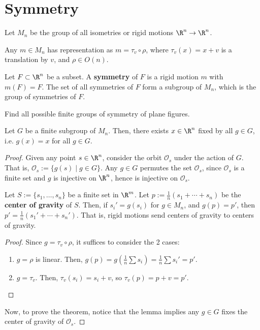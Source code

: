 \section{Symmetry}

Let $M_n$ be the group of all isometries or rigid motions $\R^n \to \R^n$.

\begin{notebox*}[Recall]
    Any $m \in M_n$ has representation as $m=\tau _v \circ \rho$, where $\tau _v(x) = x+v$ is a translation by $v$, and $\rho \in O(n)$.
\end{notebox*}

\begin{defn}
    Let $F \subset \R^n$ be a subset. A \textbf{symmetry} of $F$ is a rigid motion $m$ with $m(F)=F$. The set of all symmetries of $F$ form a subgroup of $M_n$, which is the group of symmetries of $F$.
\end{defn}

\begin{notebox*}[Goal]
    Find all possible finite groups of symmetry of plane figures.
\end{notebox*}

\begin{thm}
    Let $G$ be a finite subgroup of $M_n$. Then, there exists $x \in \R^n$ fixed by all $g \in G$, i.e. $g(x)=x$ for all $g \in G$.
\end{thm}

\begin{proof}
    Given any point $s \in \R^n$, consider the orbit $\mathcal O_s$ under the action of $G$. That is, $\mathcal O_s:=\{g(s)\mid g \in G\}$. Any $g \in G$ permutes the set $\mathcal O_s$, since $\mathcal O_s$ is a finite set and $g$ is injective on $\R^n$, hence is injective on $\mathcal O_s$.
    \begin{lem}
        Let $S:=\{s_1,\dots,s_n\}$ be a finite set in $\R^m$. Let $p:= \frac 1n(s_1+\cdots +s_n)$ be the \textbf{center of gravity} of $S$. Then, if $s_i'=g(s_i)$ for $g \in M_n$, and $g(p)=p'$, then $p'=\frac 1n(s_1'+\cdots +s_n')$. That is, rigid motions send centers of gravity to centers of gravity.
    \end{lem}
    \begin{proof}
        Since $g = \tau_v \circ \rho$, it suffices to consider the 2 cases:
        \begin{enumerate}
            \item[(i)] $g=\rho$ is linear. Then, $g(p)=g(\frac 1n \sum s_i)=\frac 1n \sum s_i'=p'$.
            \item[(ii)] $g = \tau _v$. Then, $\tau_v(s_i)=s_i+v$, so $\tau _v(p)=p+v=p'$.
        \end{enumerate}
    \end{proof}
    Now, to prove the theorem, notice that the lemma implies any $g \in G$ fixes the center of gravity of $\mathcal O_s$.
\end{proof}

